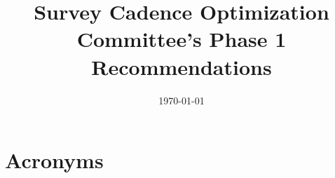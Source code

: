 \documentclass[modern]{aastex7}
\begin{document}

\date{\today}
\title{Survey Cadence Optimization Committee's Phase 1 Recommendations}





%



\section{Acronyms} \label{sec:acronyms}

\end{document}
